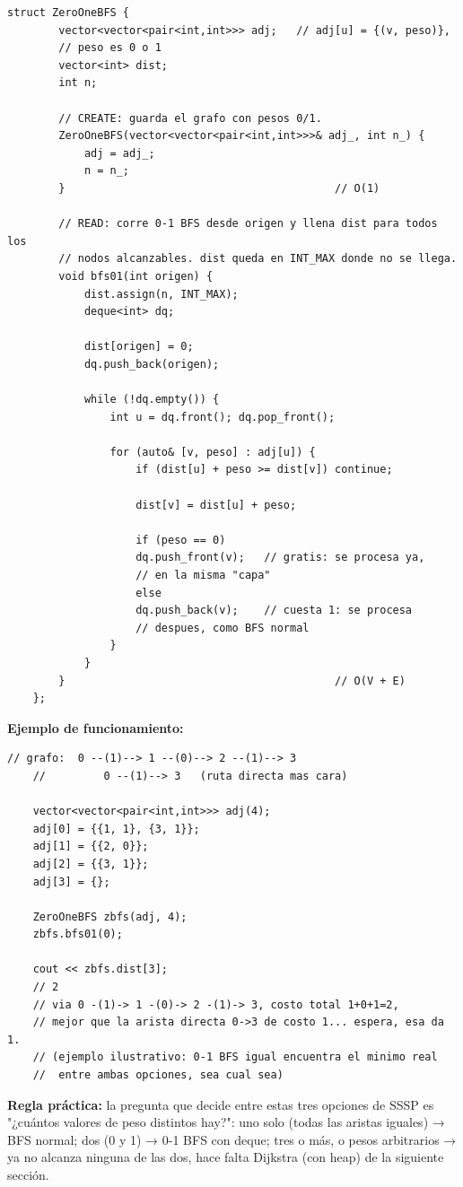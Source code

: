 \documentclass[10pt,a4paper,twocolumn]{article}
\begin{document}
\begin{lstlisting}[style=cpp]
	struct ZeroOneBFS {
		vector<vector<pair<int,int>>> adj;   // adj[u] = {(v, peso)},
		// peso es 0 o 1
		vector<int> dist;
		int n;
		
		// CREATE: guarda el grafo con pesos 0/1.
		ZeroOneBFS(vector<vector<pair<int,int>>>& adj_, int n_) {
			adj = adj_;
			n = n_;
		}                                          // O(1)
		
		// READ: corre 0-1 BFS desde origen y llena dist para todos los
		// nodos alcanzables. dist queda en INT_MAX donde no se llega.
		void bfs01(int origen) {
			dist.assign(n, INT_MAX);
			deque<int> dq;
			
			dist[origen] = 0;
			dq.push_back(origen);
			
			while (!dq.empty()) {
				int u = dq.front(); dq.pop_front();
				
				for (auto& [v, peso] : adj[u]) {
					if (dist[u] + peso >= dist[v]) continue;
					
					dist[v] = dist[u] + peso;
					
					if (peso == 0)
					dq.push_front(v);   // gratis: se procesa ya,
					// en la misma "capa"
					else
					dq.push_back(v);    // cuesta 1: se procesa
					// despues, como BFS normal
				}
			}
		}                                          // O(V + E)
	};
\end{lstlisting}

\textbf{Ejemplo de funcionamiento:}

\begin{lstlisting}[style=cpp]
	// grafo:  0 --(1)--> 1 --(0)--> 2 --(1)--> 3
	//         0 --(1)--> 3   (ruta directa mas cara)
	
	vector<vector<pair<int,int>>> adj(4);
	adj[0] = {{1, 1}, {3, 1}};
	adj[1] = {{2, 0}};
	adj[2] = {{3, 1}};
	adj[3] = {};
	
	ZeroOneBFS zbfs(adj, 4);
	zbfs.bfs01(0);
	
	cout << zbfs.dist[3];
	// 2
	// via 0 -(1)-> 1 -(0)-> 2 -(1)-> 3, costo total 1+0+1=2,
	// mejor que la arista directa 0->3 de costo 1... espera, esa da 1.
	// (ejemplo ilustrativo: 0-1 BFS igual encuentra el minimo real
	//  entre ambas opciones, sea cual sea)
\end{lstlisting}

\textbf{Regla práctica:} la pregunta que decide entre estas tres
opciones de SSSP es "¿cuántos valores de peso distintos hay?": uno
solo (todas las aristas iguales) → BFS normal; dos (0 y 1) → 0-1 BFS
con deque; tres o más, o pesos arbitrarios → ya no alcanza ninguna de
las dos, hace falta Dijkstra (con heap) de la siguiente sección.
\end{document}
